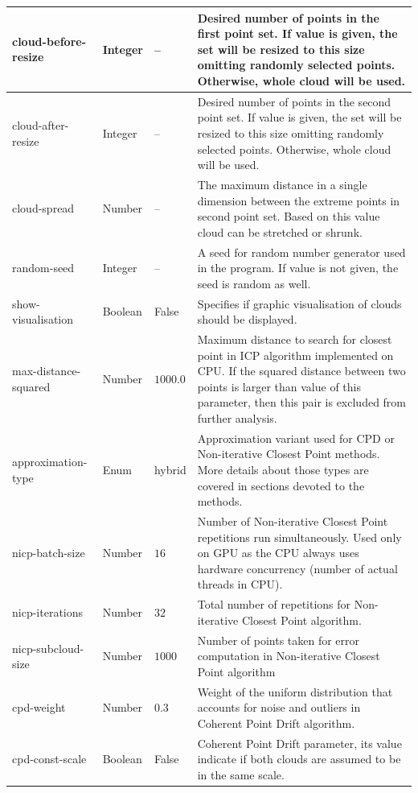 \documentclass[titlepage]{article}
\begin{document}
\begin{center}
\begin{longtable}{ | m{13em} | m{5em} | m{3em}| m{19em}| }
 \hline
 cloud-before-resize & Integer & -- & Desired number of points in the first point set. If value is given, the set will be resized to this size omitting randomly selected points. Otherwise, whole cloud will be used. \\ 
 \hline
 cloud-after-resize & Integer & -- & Desired number of points in the second point set. If value is given, the set will be resized to this size omitting randomly selected points. Otherwise, whole cloud will be used. \\ 
 \hline
 cloud-spread & Number & -- & The maximum distance in a single dimension between the extreme points in second point set. Based on this value cloud can be stretched or shrunk. \\ 
 \hline
 random-seed & Integer & -- & A seed for random number generator used in the program. If value is not given, the seed is random as well. \\ 
 \hline
 show-visualisation & Boolean & False & Specifies if graphic visualisation of clouds should be displayed. \\ 
 \hline
 max-distance-squared & Number & $1000.0$ & Maximum distance to search for closest point in ICP algorithm implemented on CPU. If the squared distance between two points is larger than value of this parameter, then this pair is excluded from further analysis. \\ 
 \hline
 approximation-type & Enum & hybrid & Approximation variant used for CPD or Non-iterative Closest Point methods. More details about those types are covered in sections devoted to the methods. \\ 
 \hline
 nicp-batch-size & Number & $16$ & Number of Non-iterative Closest Point repetitions run simultaneously. Used only on GPU as the CPU always uses hardware concurrency (number of actual threads in CPU). \\ 
 \hline
 nicp-iterations & Number & $32$ & Total number of repetitions for Non-iterative Closest Point algorithm. \\ 
 \hline
 nicp-subcloud-size & Number & $1000$ & Number of points taken for error computation in Non-iterative Closest Point algorithm \\ 
 \hline 
 cpd-weight & Number & $0.3$ & Weight of the uniform distribution that accounts for noise and outliers in Coherent Point Drift algorithm. \\ 
 \hline
 cpd-const-scale & Boolean & False & Coherent Point Drift parameter, its value indicate if both clouds are assumed to be in the same scale. \\ 

\end{longtable}
\end{center}
\end{document}

